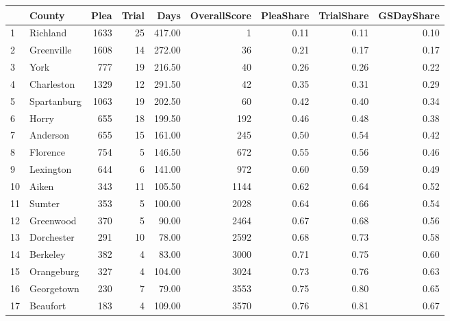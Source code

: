 \begin{tabular}{llrrrrrrr}
\toprule
{} &        County &  Plea &  Trial &   Days &  OverallScore &  PleaShare &  TrialShare &  GSDayShare \\
\midrule
1  &      Richland &  1633 &     25 & 417.00 &             1 &       0.11 &        0.11 &        0.10 \\
2  &    Greenville &  1608 &     14 & 272.00 &            36 &       0.21 &        0.17 &        0.17 \\
3  &          York &   777 &     19 & 216.50 &            40 &       0.26 &        0.26 &        0.22 \\
4  &    Charleston &  1329 &     12 & 291.50 &            42 &       0.35 &        0.31 &        0.29 \\
5  &   Spartanburg &  1063 &     19 & 202.50 &            60 &       0.42 &        0.40 &        0.34 \\
6  &         Horry &   655 &     18 & 199.50 &           192 &       0.46 &        0.48 &        0.38 \\
7  &      Anderson &   655 &     15 & 161.00 &           245 &       0.50 &        0.54 &        0.42 \\
8  &      Florence &   754 &      5 & 146.50 &           672 &       0.55 &        0.56 &        0.46 \\
9  &     Lexington &   644 &      6 & 141.00 &           972 &       0.60 &        0.59 &        0.49 \\
10 &         Aiken &   343 &     11 & 105.50 &          1144 &       0.62 &        0.64 &        0.52 \\
11 &        Sumter &   353 &      5 & 100.00 &          2028 &       0.64 &        0.66 &        0.54 \\
12 &     Greenwood &   370 &      5 &  90.00 &          2464 &       0.67 &        0.68 &        0.56 \\
13 &    Dorchester &   291 &     10 &  78.00 &          2592 &       0.68 &        0.73 &        0.58 \\
14 &      Berkeley &   382 &      4 &  83.00 &          3000 &       0.71 &        0.75 &        0.60 \\
15 &    Orangeburg &   327 &      4 & 104.00 &          3024 &       0.73 &        0.76 &        0.63 \\
16 &    Georgetown &   230 &      7 &  79.00 &          3553 &       0.75 &        0.80 &        0.65 \\
17 &      Beaufort &   183 &      4 & 109.00 &          3570 &       0.76 &        0.81 &        0.67 \\

\end{tabular}
